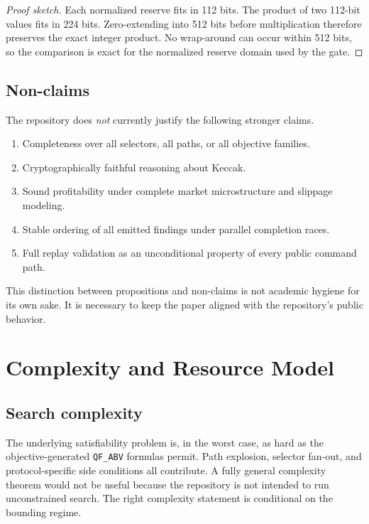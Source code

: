 \documentclass[11pt]{article}
\numberwithin{equation}{section}
\theoremstyle{remark}
\newcommand{\QFABV}{\texttt{QF\_ABV}}
\begin{document}
\begin{proof}[Proof sketch]
Each normalized reserve fits in 112 bits. The product of two 112-bit values fits in 224 bits. Zero-extending into 512 bits before multiplication therefore preserves the exact integer product. No wrap-around can occur within 512 bits, so the comparison is exact for the normalized reserve domain used by the gate.
\end{proof}

\subsection{Non-claims}

The repository does \emph{not} currently justify the following stronger claims.
\begin{enumerate}[leftmargin=1.5em]
  \item Completeness over all selectors, all paths, or all objective families.
  \item Cryptographically faithful reasoning about Keccak.
  \item Sound profitability under complete market microstructure and slippage modeling.
  \item Stable ordering of all emitted findings under parallel completion races.
  \item Full replay validation as an unconditional property of every public command path.
\end{enumerate}

This distinction between propositions and non-claims is not academic hygiene for its own sake. It is necessary to keep the paper aligned with the repository's public behavior.

\section{Complexity and Resource Model}
\label{sec:complexity}

\subsection{Search complexity}

The underlying satisfiability problem is, in the worst case, as hard as the objective-generated \QFABV{} formulas permit. Path explosion, selector fan-out, and protocol-specific side conditions all contribute. A fully general complexity theorem would not be useful because the repository is not intended to run unconstrained search. The right complexity statement is conditional on the bounding regime.
\end{document}

